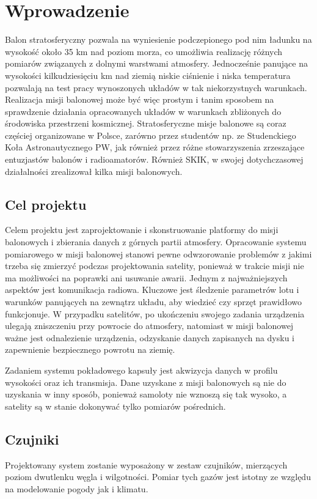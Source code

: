 \documentclass[a4paper,12pt]{article}
\begin{document}
\section{Wprowadzenie}
Balon stratosferyczny pozwala na wyniesienie podczepionego pod nim ładunku na wysokość około 35 km nad poziom morza, co umożliwia realizację różnych pomiarów związanych z dolnymi warstwami atmosfery. Jednocześnie panujące na wysokości kilkudziesięciu km nad ziemią  niskie ciśnienie i niska temperatura pozwalają na test pracy wynoszonych układów w tak niekorzystnych warunkach. Realizacja misji balonowej może być więc prostym i tanim sposobem na sprawdzenie działania opracowanych układów w warunkach zbliżonych do środowiska przestrzeni kosmicznej.
Stratosferyczne misje balonowe są coraz częściej organizowane w Polsce, zarówno przez studentów np. ze Studenckiego Koła Astronautycznego PW, jak  również przez różne stowarzyszenia zrzeszające entuzjastów balonów i radioamatorów.
Również SKIK, w swojej dotychczasowej działalności zrealizował kilka misji balonowych.
\subsection{Cel projektu}
Celem projektu jest zaprojektowanie i skonstruowanie platformy do misji balonowych i zbierania danych z górnych partii atmosfery. Opracowanie systemu pomiarowego w misji balonowej stanowi pewne odwzorowanie problemów z jakimi trzeba się zmierzyć podczas projektowania satelity, ponieważ w trakcie misji nie ma możliwości na poprawki ani usuwanie awarii. Jednym z najważniejszych aspektów jest komunikacja radiowa. Kluczowe jest śledzenie parametrów lotu i warunków panujących na zewnątrz układu, aby wiedzieć czy sprzęt prawidłowo funkcjonuje. W przypadku satelitów, po ukończeniu swojego zadania urządzenia ulegają zniszczeniu przy powrocie do atmosfery, natomiast w misji balonowej ważne jest odnalezienie urządzenia, odzyskanie danych zapisanych na dysku i zapewnienie bezpiecznego powrotu na ziemię.

Zadaniem systemu pokładowego kapsuły jest akwizycja danych w profilu wysokości oraz ich transmisja. Dane uzyskane z misji balonowych są nie do uzyskania w inny sposób, ponieważ samoloty nie wznoszą się tak wysoko, a satelity są w stanie dokonywać tylko pomiarów pośrednich.

\subsection{Czujniki}
Projektowany system zostanie wyposażony w zestaw czujników, mierzących poziom dwutlenku węgla i wilgotności. Pomiar tych gazów jest istotny ze względu na modelowanie pogody jak i klimatu.
\end{document}
